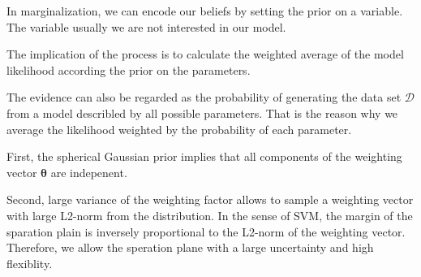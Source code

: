 \documentclass[12pt]{article}
\newenvironment{question}[2][Question]{\begin{trivlist}
\kern10pt
\item[\hskip \labelsep {\bfseries #1}\hskip \labelsep {\bfseries #2.}]}{\end{trivlist}}
\begin{document}
\begin{question}{20}
In marginalization, we can encode our beliefs by setting the prior on a variable.
The variable usually we are not interested in our model.

The implication of the process is to calculate the weighted average of the model
likelihood according the prior on the parameters.

The evidence can also be regarded as the probability of generating the data set 
$\mathcal{D}$ from a model describled by all possible parameters. That is 
the reason why we average the likelihood weighted by the probability of each parameter.
\end{question}

\begin{question}{21}
First, the spherical Gaussian prior implies that all components of the weighting
vector $\bm{\theta}$ are indepenent.

Second, large variance of the weighting factor allows to sample a weighting vector
with large L2-norm from the distribution. 
In the sense of SVM, the margin of the sparation plain is 
inversely proportional to the L2-norm of the weighting vector. Therefore, we
allow the speration plane with a large uncertainty and high 
flexiblity.
\end{question}
\end{document}
